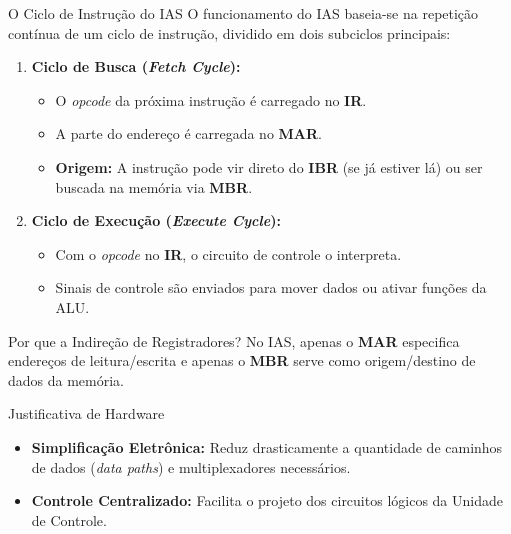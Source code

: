 \begin{frame}{O Ciclo de Instrução do IAS}
    O funcionamento do IAS baseia-se na repetição contínua de um ciclo de instrução, dividido em dois subciclos principais:

    \begin{enumerate}
        \item \textbf{Ciclo de Busca (\textit{Fetch Cycle}):}
              \begin{itemize}
                  \item O \textit{opcode} da próxima instrução é carregado no \textbf{IR}.
                  \item A parte do endereço é carregada no \textbf{MAR}.
                  \item \textbf{Origem:} A instrução pode vir direto do \textbf{IBR} (se já estiver lá) ou ser buscada na memória via \textbf{MBR}.
              \end{itemize}
              \vspace{0.2cm}
        \item \textbf{Ciclo de Execução (\textit{Execute Cycle}):}
              \begin{itemize}
                  \item Com o \textit{opcode} no \textbf{IR}, o circuito de controle o interpreta.
                  \item Sinais de controle são enviados para mover dados ou ativar funções da ALU.
              \end{itemize}
    \end{enumerate}
\end{frame}

\begin{frame}{Por que a Indireção de Registradores?}
    No IAS, apenas o \textbf{MAR} especifica endereços de leitura/escrita e apenas o \textbf{MBR} serve como origem/destino de dados da memória.

    \begin{block}{Justificativa de Hardware}
        \begin{itemize}
            \item \textbf{Simplificação Eletrônica:} Reduz drasticamente a quantidade de caminhos de dados (\textit{data paths}) e multiplexadores necessários.
            \item \textbf{Controle Centralizado:} Facilita o projeto dos circuitos lógicos da Unidade de Controle.
        \end{itemize}
    \end{block}
\end{frame}

